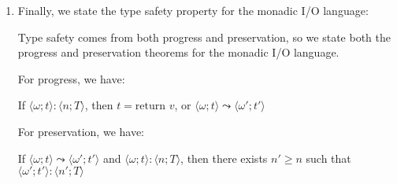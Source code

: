 \begin{enumerate}
      \item
        Finally, we state the type safety property for the monadic I/O language:

        Type safety comes from both progress and preservation, so we state both the progress and preservation theorems for the monadic I/O language.

        For progress, we have:

        If $\langle \omega;t \rangle : \langle n ; T \rangle$, then $t = \text{return }v$, or $\langle \omega;t \rangle \leadsto \langle \omega'; t'\rangle$

        For preservation, we have:

        If $\langle \omega;t \rangle \leadsto \langle \omega'; t' \rangle$ and $\langle \omega;t \rangle : \langle n ; T \rangle$, then there exists $n' \geq n$ such that $\langle \omega' ;t' \rangle : \langle n' ; T \rangle$





        
    \end{enumerate}

